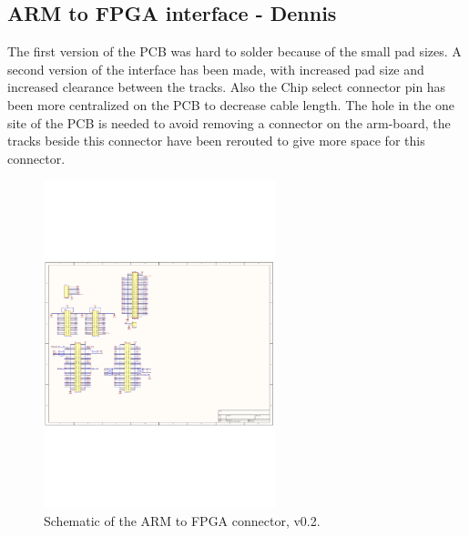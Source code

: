 \subsection{ARM to FPGA interface - Dennis}
The first version of the PCB was hard to solder because of the small pad sizes. A second version of the interface has been made, with increased pad size and increased clearance between the tracks. Also the Chip select connector pin has been more centralized on the PCB to decrease cable length. The hole in the one site of the PCB is needed to avoid removing a connector on the arm-board, the tracks beside this connector have been rerouted to give more space for this connector. 
\begin{figure}[H]
	\begin{centering}
		 \includegraphics[width=0.60\textwidth,page=1]{images/dig_to_ea_v0_2}
		\caption{Schematic of the ARM to FPGA connector, v0.2.}
	\end{centering}
\end{figure}

